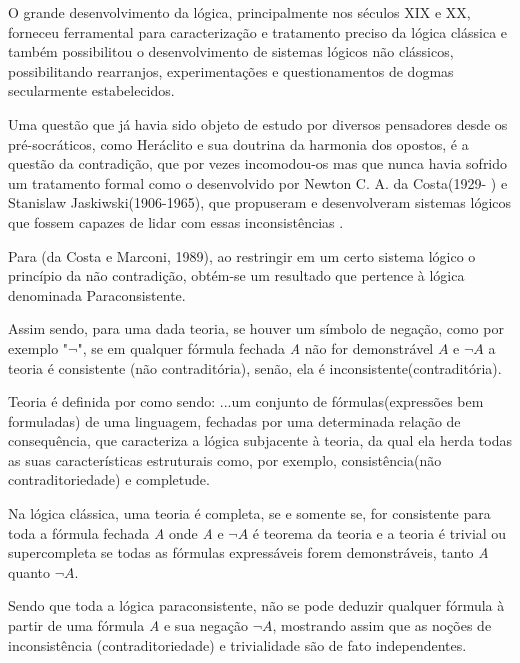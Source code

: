 O grande desenvolvimento da lógica, principalmente nos séculos XIX e XX, forneceu ferramental para caracterização e tratamento preciso da lógica clássica e também possibilitou o desenvolvimento de sistemas lógicos não clássicos, possibilitando rearranjos, experimentações e questionamentos de dogmas secularmente estabelecidos.

Uma questão que já havia sido objeto de estudo por diversos pensadores desde os pré-socráticos, como Heráclito e sua doutrina da harmonia dos opostos, é a questão da contradição, que por vezes incomodou-os mas que nunca havia sofrido um tratamento formal como o desenvolvido por Newton C. A. da Costa(1929- ) e Stanislaw Jaskiwski(1906-1965), que propuseram e desenvolveram sistemas lógicos que fossem capazes de lidar com essas inconsistências \cite{DecioKrause}. 

Para (da Costa e Marconi, 1989), ao restringir em um certo sistema lógico o princípio da não contradição, obtém-se um resultado que pertence à lógica denominada Paraconsistente.


Assim sendo, para uma dada teoria, se houver um símbolo de negação, como por exemplo "\emph{$\neg $}", se em qualquer fórmula fechada \emph{A} não for demonstrável \emph{$A$} e \emph{$\neg A $} a teoria é consistente (não contraditória), senão, ela é inconsistente(contraditória).


Teoria é definida por \cite{Gomes2013}  como sendo:
\citacao
{
...um conjunto de fórmulas(expressões bem formuladas) de uma linguagem, fechadas por uma determinada relação de consequência, que caracteriza a lógica subjacente à teoria, da qual ela herda todas as suas características estruturais como, por exemplo, consistência(não contraditoriedade) e completude.
}

Na lógica clássica, uma teoria é completa, se e somente se, for consistente para toda a fórmula fechada \emph{A} onde \emph{A} e \emph{$\neg A$} é teorema da teoria e a teoria é trivial ou supercompleta se todas as fórmulas expressáveis forem demonstráveis, tanto \emph{A} quanto \emph{$ \neg A$}.


Sendo que toda a lógica paraconsistente, não se pode deduzir qualquer fórmula à partir de uma fórmula \emph{A} e sua negação \emph{$\neg A$}, mostrando assim que as noções de inconsistência (contraditoriedade) e trivialidade são de fato independentes.




